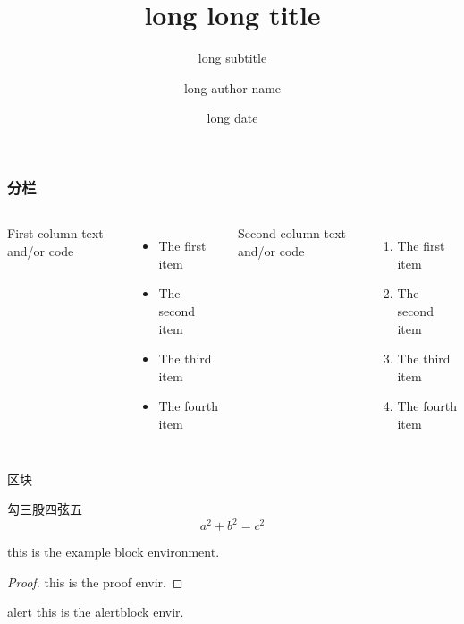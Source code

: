\documentclass[10pt]{beamer}
\title[short title]{long long title}
\subtitle[short subtitle]{long subtitle}
\author[short author name]{long author name}
\date[short date]{long date}
\institute[short Ins name]{long ins name}
\begin{document}
	\frame{\titlepage} %
	\begin{frame}[c]\frametitle{分栏}
	\begin{columns}  %
		First column text and/or code
		\begin{itemize}		%
			\item The first item
			\item The second item
			\item The third item
			\item The fourth item
		\end{itemize}
		Second column text and/or code
		\begin{enumerate}	%
			\item The first item
			\item The second item
			\item The third item
			\item The fourth item
		\end{enumerate}
	\end{columns}
	\end{frame}

	\begin{frame}[c]{区块}  %
		\begin{theorem}[勾股定理]
			勾三股四弦五\centering
			\begin{equation}
				a^2 + b^2 = c^2
			\end{equation}
		\end{theorem}
		
		\begin{example} %
			this is the example block environment.
		\end{example}
	
		
	
		\begin{proof}  %
			this is the proof envir.
		\end{proof}
	
	
		\begin{alertblock}{alert}%
			this is the alertblock envir.
		\end{alertblock}
	
	\end{frame}
\end{document}
